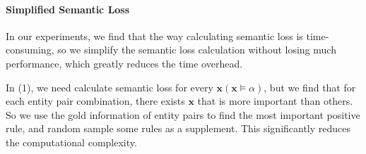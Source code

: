 \paragraph{Simplified Semantic Loss}

In our experiments, we find that the way \cite{xu2017semantic} calculating semantic loss is time-consuming, so we simplify the semantic loss calculation without losing much performance, which greatly reduces the time overhead.

In (1), we need calculate semantic loss for every $ \bm x (\bm x \models \alpha)$, but we find that for each entity pair combination, there exists $ \bm x $ that is more important than others. So we use the gold information of entity pairs to find the most important positive rule, and random sample some rules as a supplement. This significantly reduces the computational complexity.

